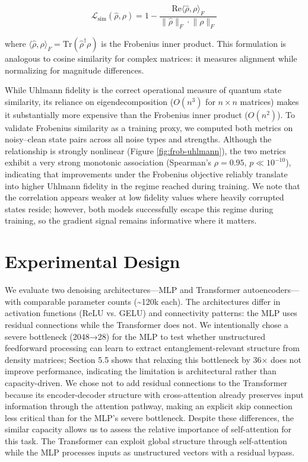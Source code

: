 \documentclass[11pt]{article}
\begin{document}
$$
\mathcal{L}_{\text{sim}}(\hat{\rho}, \rho) = 1 - \frac{\mathrm{Re}\langle \hat{\rho}, \rho \rangle_F}{\lVert \hat{\rho} \rVert_F \cdot \lVert \rho \rVert_F}
$$

where \(\langle \hat{\rho}, \rho \rangle_F = \mathrm{Tr}(\hat{\rho}^\dagger \rho)\) is the Frobenius inner product. This formulation is analogous to cosine similarity for complex matrices: it measures alignment while normalizing for magnitude differences.

While Uhlmann fidelity is the correct operational measure of quantum state similarity, its reliance on eigendecomposition (\(O(n^3)\) for \(n \times n\) matrices) makes it substantially more expensive than the Frobenius inner product (\(O(n^2)\)). To validate Frobenius similarity as a training proxy, we computed both metrics on noisy–clean state pairs across all noise types and strengths. Although the relationship is strongly nonlinear (Figure \ref{fig:frob-uhlmann}), the two metrics exhibit a very strong monotonic association (Spearman's \(\rho = 0.95\), \(p \ll 10^{-10}\)), indicating that improvements under the Frobenius objective reliably translate into higher Uhlmann fidelity in the regime reached during training. We note that the correlation appears weaker at low fidelity values where heavily corrupted states reside; however, both models successfully escape this regime during training, so the gradient signal remains informative where it matters.

\newpage
\section{Experimental Design}
\label{sec:org3860985}
We evaluate two denoising architectures—MLP and Transformer autoencoders—with comparable parameter counts (\textasciitilde{}120k each). The architectures differ in activation functions (ReLU vs. GELU) and connectivity patterns: the MLP uses residual connections while the Transformer does not. We intentionally chose a severe bottleneck (2048→28) for the MLP to test whether unstructured feedforward processing can learn to extract entanglement-relevant structure from density matrices; Section 5.5 shows that relaxing this bottleneck by 36× does not improve performance, indicating the limitation is architectural rather than capacity-driven. We chose not to add residual connections to the Transformer because its encoder-decoder structure with cross-attention already preserves input information through the attention pathway, making an explicit skip connection less critical than for the MLP's severe bottleneck. Despite these differences, the similar capacity allows us to assess the relative importance of self-attention for this task. The Transformer can exploit global structure through self-attention while the MLP processes inputs as unstructured vectors with a residual bypass.
\end{document}
